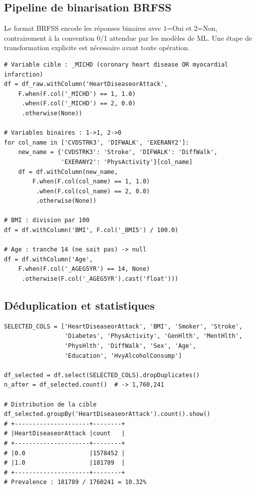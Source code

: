 \subsection{Pipeline de binarisation BRFSS}

Le format BRFSS encode les réponses binaires avec 1=Oui et 2=Non, contrairement à la convention 0/1 attendue par les modèles de ML. Une étape de transformation explicite est nécessaire avant toute opération.

\begin{lstlisting}[caption=Binarisation et création de la variable cible, label=lst:binarize]
# Variable cible : _MICHD (coronary heart disease OR myocardial infarction)
df = df_raw.withColumn('HeartDiseaseorAttack',
    F.when(F.col('_MICHD') == 1, 1.0)
     .when(F.col('_MICHD') == 2, 0.0)
     .otherwise(None))

# Variables binaires : 1->1, 2->0
for col_name in ['CVDSTRK3', 'DIFWALK', 'EXERANY2']:
    new_name = {'CVDSTRK3': 'Stroke', 'DIFWALK': 'DiffWalk',
                'EXERANY2': 'PhysActivity'}[col_name]
    df = df.withColumn(new_name,
        F.when(F.col(col_name) == 1, 1.0)
         .when(F.col(col_name) == 2, 0.0)
         .otherwise(None))

# BMI : division par 100
df = df.withColumn('BMI', F.col('_BMI5') / 100.0)

# Age : tranche 14 (ne sait pas) -> null
df = df.withColumn('Age',
    F.when(F.col('_AGEG5YR') == 14, None)
     .otherwise(F.col('_AGEG5YR').cast('float')))
\end{lstlisting}

\subsection{Déduplication et statistiques}

\begin{lstlisting}[caption=Déduplication et diagnostic, label=lst:dedup]
SELECTED_COLS = ['HeartDiseaseorAttack', 'BMI', 'Smoker', 'Stroke',
                 'Diabetes', 'PhysActivity', 'GenHlth', 'MentHlth',
                 'PhysHlth', 'DiffWalk', 'Sex', 'Age',
                 'Education', 'HvyAlcoholConsump']

df_selected = df.select(SELECTED_COLS).dropDuplicates()
n_after = df_selected.count()  # -> 1,760,241

# Distribution de la cible
df_selected.groupBy('HeartDiseaseorAttack').count().show()
# +---------------------+--------+
# |HeartDiseaseorAttack |count   |
# +---------------------+--------+
# |0.0                  |1578452 |
# |1.0                  |181789  |
# +---------------------+--------+
# Prevalence : 181789 / 1760241 = 10.32%
\end{lstlisting}

